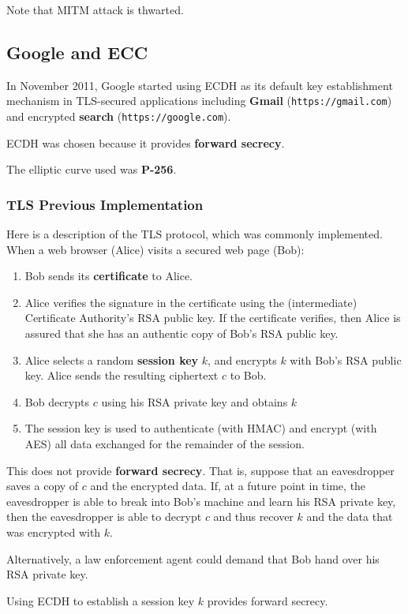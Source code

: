 \documentclass[12pt,titlepage]{article}
\begin{document}
Note that MITM attack is thwarted. 

\subsection{Google and ECC}
In November 2011, Google started using ECDH as its default key establishment mechanism in TLS-secured applications including \textbf{Gmail} (\texttt{https://gmail.com}) and encrypted \textbf{search} (\texttt{https://google.com}).

ECDH was chosen because it provides \textbf{forward secrecy}.

The elliptic curve used was \textbf{P-256}.
\subsubsection{TLS Previous Implementation}
Here is a description of the TLS protocol, which was commonly implemented. When a web browser (Alice) visits a secured web page (Bob): \begin{enumerate}
	\item Bob sends its \textbf{certificate} to Alice.
	\item Alice verifies the signature in the certificate using the (intermediate) Certificate Authority’s RSA public key. If the certificate verifies, then Alice is assured that she has an authentic copy of Bob’s RSA public key.
	\item Alice selects a random \textbf{session key} $k$, and encrypts $k$ with Bob’s RSA public key. Alice sends the resulting ciphertext $c$ to Bob.
	\item Bob decrypts $c$ using his RSA private key and obtains $k$
	\item The session key is used to authenticate (with HMAC) and encrypt (with AES) all data exchanged for the remainder of the session.
\end{enumerate}

This does not provide \textbf{forward secrecy}. That is, suppose that an eavesdropper saves a copy of $c$ and the encrypted data. If, at a future point in time, the eavesdropper is able to break into Bob’s machine and learn his RSA private key, then the eavesdropper is able to decrypt $c$ and thus recover $k$ and the data that was encrypted with $k$. 

Alternatively, a law enforcement agent could demand that Bob hand over his RSA private key.

Using ECDH to establish a session key $k$ provides forward secrecy.
\end{document}

